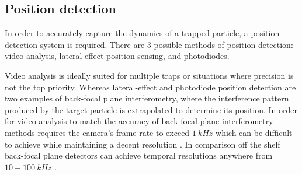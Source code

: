 \subsection{Position detection}
\label{sec:position_detection}
In order to accurately capture the dynamics of a trapped particle, a 
position detection system is required. There are 3 possible methods 
of position detection: video-analysis, lateral-effect position sensing, 
and photodiodes. 

Video analysis is ideally suited for multiple traps or situations where 
precision is not the top priority. Whereas lateral-effect and photodiode 
position detection are two examples of back-focal plane interferometry, 
where the interference pattern produced by the target particle is 
extrapolated to determine its position. In order for video analysis to 
match the accuracy of back-focal plane interferometry methods requires 
the camera's frame rate to exceed $1\ kHz$ which can be difficult to 
achieve while maintaining a decent resolution \cite{Gibson2008}. In 
comparison off the shelf back-focal plane detectors can achieve temporal 
resolutions anywhere from $10-100\ kHz$ \cite{BergSoerensen2004}. 
 
